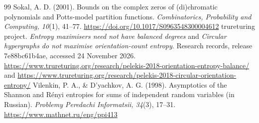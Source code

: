\documentclass[11pt,a4paper]{article}
\theoremstyle{definition}\newtheorem{remark}[theorem]{Remark}\newtheorem{conjecture}{Conjecture}
\begin{document}
\begin{thebibliography}{99}
 Sokal, A. D. (2001). Bounds on the complex zeros of (di)chromatic polynomials and Potts-model partition functions. \emph{Combinatorics, Probability and Computing, 10}(1), 41--77. \url{https://doi.org/10.1017/S0963548300004612}
 trureturing project. \emph{Entropy maximisers need not have balanced degrees} and \emph{Circular hypergraphs do not maximise orientation-count entropy}. Research records, release 7e88bc61b4ae, accessed 24 November 2026. \url{https://www.trureturing.org/research/pelekis-2018-orientation-entropy-balance/} and \url{https://www.trureturing.org/research/pelekis-2018-circular-orientation-entropy/}
 Vilenkin, P. A., \& D'yachkov, A. G. (1998). Asymptotics of the Shannon and R\'enyi entropies for sums of independent random variables (in Russian). \emph{Problemy Peredachi Informatsii, 34}(3), 17--31. \url{https://www.mathnet.ru/eng/ppi413}
\end{thebibliography}
\end{document}

